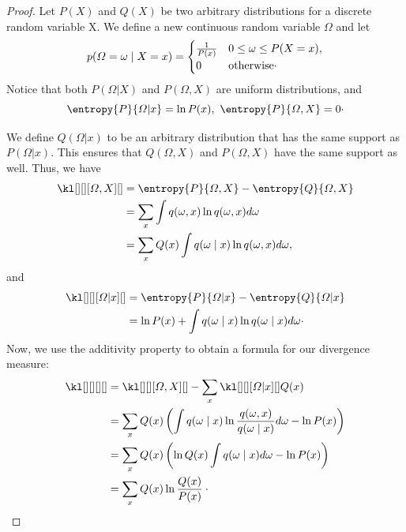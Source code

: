 \begin{proof}
    \newcommand{\D}[1][]{\kl[][][#1][ ]}
    \newcommand{\T}{\varOmega}
    \renewcommand{\t}{\omega}
    \renewcommand{\tIx}{\t \mid x}
    \newcommand{\X}{X}
    \newcommand{\Y}{Y}

    \newcommand{\TIx}{\T|x}
    \newcommand{\TX}{\T, X}
    \newcommand{\tx}{\t, x}
    \newcommand{\tent}[1]{\int q(#1) \ln q(#1) d\t}
    \newcommand{\Qx}{Q(x)}
    \newcommand{\sumx}{\sum_{x}}

    Let $P(X)$ and $Q(X)$ be two arbitrary distributions for a discrete random variable X.
    We define a new continuous random variable $\T$ and let
    \begin{equation*}
        p(\T = \t \mid \rvEq) =
        \begin{cases}
            \frac{1}{P(x)} & 0 \leq \t \leq P(\rvEq), \\
            0                       & \text{otherwise}\cdot
        \end{cases}
    \end{equation*}
    Notice that both $P(\T|X)$ and $P(\TX)$ are uniform distributions, and
    \[\entropy{P}{\TIx} = \ln P(x),\ \entropy{P}{\TX} = 0 \cdot\]

    We define $Q(\TIx)$ to be an arbitrary distribution that has the same support as $P(\TIx)$.
    This ensures that $Q(\TX)$ and $P(\TX)$ have the same support as well.
    Thus, we have
    \begin{align*}
        \D[\TX] & = \entropy{P}{\TX} - \entropy{Q}{\TX}    \\
        & = \sumx \tent{\tx}                       \\
        & = \sumx \Qx \int q(\tIx) \ln q(\tx) d\t,
    \end{align*}
    and
    \begin{align*}
        \D[\TIx] & = \entropy{P}{\TIx} - \entropy{Q}{\TIx} \\
        & = \ln P(x) + \tent{\tIx}\cdot
    \end{align*}
    Now, we use the additivity property to obtain a formula for our divergence measure:
    \begin{align*}
        \D & = \D[\TX] - \sumx \D[\TIx]\Qx                                                              \\
        & = \sumx \Qx  \left( \int q(\tIx) \ln \frac{q(\tx)}{q(\tIx)}d\t - \ln P(x) \right) \\
        & = \sumx \Qx  \left( \ln \Qx \int q(\tIx) d\t - \ln P(x) \right)                   \\
        & = \sumx \Qx \ln \frac{\Qx}{P(x)}\cdot \qedhere
    \end{align*}
\end{proof}

